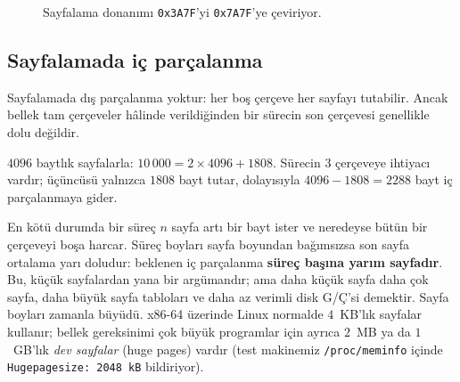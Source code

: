 \begin{figure}[H]
\centering
{}
\caption{Sayfalama donanımı \texttt{0x3A7F}'yi \texttt{0x7A7F}'ye çeviriyor.}
\end{figure}

\subsection{Sayfalamada iç parçalanma}

Sayfalamada dış parçalanma yoktur: her boş çerçeve her sayfayı tutabilir. Ancak bellek tam çerçeveler hâlinde verildiğinden bir sürecin son çerçevesi genellikle dolu değildir.

\begin{example}
$4096$ baytlık sayfalarla: $10\,000 = 2 \times 4096 + 1808$. Sürecin $3$ çerçeveye ihtiyacı vardır; üçüncüsü yalnızca $1808$ bayt tutar, dolayısıyla $4096 - 1808 = 2288$ bayt iç parçalanmaya gider.
\end{example}

En kötü durumda bir süreç $n$ sayfa artı bir bayt ister ve neredeyse bütün bir çerçeveyi boşa harcar. Süreç boyları sayfa boyundan bağımsızsa son sayfa ortalama yarı doludur: beklenen iç parçalanma \textbf{süreç başına yarım sayfadır}. Bu, küçük sayfalardan yana bir argümandır; ama daha küçük sayfa daha çok sayfa, daha büyük sayfa tabloları ve daha az verimli disk G/Ç'si demektir. Sayfa boyları zamanla büyüdü. x86-64 üzerinde Linux normalde $4$~KB'lık sayfalar kullanır; bellek gereksinimi çok büyük programlar için ayrıca $2$~MB ya da $1$~GB'lık \emph{dev sayfalar} (huge pages) vardır (test makinemiz \texttt{/proc/meminfo} içinde \texttt{Hugepagesize: 2048 kB} bildiriyor).

